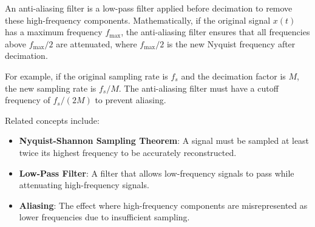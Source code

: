 An anti-aliasing filter is a low-pass filter applied before decimation to remove these high-frequency components. Mathematically, if the original signal \( x(t) \) has a maximum frequency \( f_{\text{max}} \), the anti-aliasing filter ensures that all frequencies above \( f_{\text{max}}/2 \) are attenuated, where \( f_{\text{max}}/2 \) is the new Nyquist frequency after decimation.

For example, if the original sampling rate is \( f_s \) and the decimation factor is \( M \), the new sampling rate is \( f_s/M \). The anti-aliasing filter must have a cutoff frequency of \( f_s/(2M) \) to prevent aliasing.

Related concepts include:
\begin{itemize}
    \item \textbf{Nyquist-Shannon Sampling Theorem}: A signal must be sampled at least twice its highest frequency to be accurately reconstructed.
    \item \textbf{Low-Pass Filter}: A filter that allows low-frequency signals to pass while attenuating high-frequency signals.
    \item \textbf{Aliasing}: The effect where high-frequency components are misrepresented as lower frequencies due to insufficient sampling.
\end{itemize}

